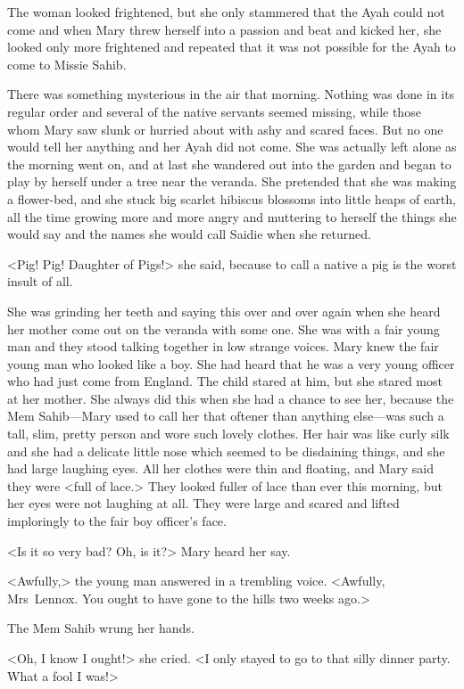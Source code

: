 The woman looked frightened, but she only stammered that the Ayah could not come and when Mary threw herself into a passion and beat and kicked her, she looked only more frightened and repeated that it was not possible for the Ayah to come to Missie Sahib.

There was something mysterious in the air that morning. Nothing was done in its regular order and several of the native servants seemed missing, while those whom Mary saw slunk or hurried about with ashy and scared faces. But no one would tell her anything and her Ayah did not come. She was actually left alone as the morning went on, and at last she wandered out into the garden and began to play by herself under a tree near the veranda. She pretended that she was making a flower-bed, and she stuck big scarlet hibiscus blossoms into little heaps of earth, all the time growing more and more angry and muttering to herself the things she would say and the names she would call Saidie when she returned.

<Pig! Pig! Daughter of Pigs!> she said, because to call a native a pig is the worst insult of all.

She was grinding her teeth and saying this over and over again when she heard her mother come out on the veranda with some one. She was with a fair young man and they stood talking together in low strange voices. Mary knew the fair young man who looked like a boy. She had heard that he was a very young officer who had just come from England. The child stared at him, but she stared most at her mother. She always did this when she had a chance to see her, because the Mem Sahib—Mary used to call her that oftener than anything else—was such a tall, slim, pretty person and wore such lovely clothes. Her hair was like curly silk and she had a delicate little nose which seemed to be disdaining things, and she had large laughing eyes. All her clothes were thin and floating, and Mary said they were <full of lace.> They looked fuller of lace than ever this morning, but her eyes were not laughing at all. They were large and scared and lifted imploringly to the fair boy officer's face.

<Is it so very bad? Oh, is it?> Mary heard her say.

<Awfully,> the young man answered in a trembling voice. <Awfully, Mrs~Lennox. You ought to have gone to the hills two weeks ago.>

The Mem Sahib wrung her hands.

<Oh, I know I ought!> she cried. <I only stayed to go to that silly dinner party. What a fool I was!>

